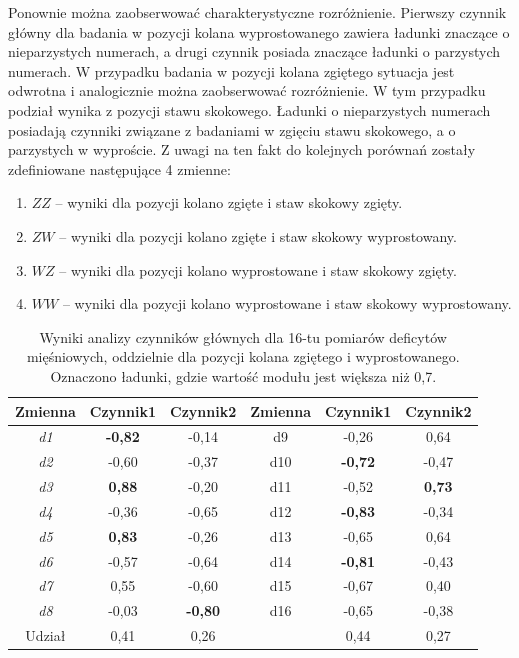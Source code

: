 Ponownie można zaobserwować charakterystyczne rozróżnienie. Pierwszy czynnik główny dla badania w pozycji kolana wyprostowanego zawiera ładunki znaczące o nieparzystych numerach, a drugi czynnik posiada znaczące ładunki o parzystych numerach. W przypadku badania w pozycji kolana zgiętego sytuacja jest odwrotna i analogicznie można zaobserwować rozróżnienie. W tym przypadku podział wynika z pozycji stawu skokowego. Ładunki o nieparzystych numerach posiadają czynniki związane z badaniami w zgięciu stawu skokowego, a o parzystych w wyproście. \linebreak Z uwagi na ten fakt do kolejnych porównań zostały zdefiniowane następujące 4 zmienne:
\begin{enumerate}
	\item $ZZ$ -- wyniki dla pozycji kolano zgięte i staw skokowy zgięty.
	\item $ZW$ -- wyniki dla pozycji kolano zgięte i staw skokowy wyprostowany.
	\item $WZ$ -- wyniki dla pozycji kolano wyprostowane i staw skokowy zgięty.
	\item $WW$ -- wyniki dla pozycji kolano wyprostowane i staw skokowy wyprostowany.
\end{enumerate} 
\begin{table}[h!]
	\centering
	\setlength{\tabcolsep}{3pt}
	\setlength\extrarowheight{2pt}
	\caption{Wyniki analizy czynników głównych dla 16-tu pomiarów deficytów mięśniowych, oddzielnie dla pozycji kolana zgiętego i wyprostowanego. Oznaczono ładunki, gdzie wartość modułu jest większa niż 0,7.}
	\label{tab:pca-muscles-knee-strait-bended}
	\begin{tabular}{c|c|c||c|c|c}
		
		Zmienna&Czynnik1&Czynnik2&Zmienna&Czynnik1&Czynnik2 \\
		\hline \hline
		\textit{d1}&\textbf{-0,82}&-0,14&d9&-0,26&0,64 \\
		\hline
		\textit{d2}&-0,60&-0,37&d10&\textbf{-0,72}&-0,47 \\
		\hline
		\textit{d3}&\textbf{0,88}&-0,20&d11&-0,52&\textbf{0,73} \\
		\hline
		\textit{d4}&-0,36&-0,65&d12&\textbf{-0,83}&-0,34 \\
		\hline
		\textit{d5}&\textbf{0,83}&-0,26&d13&-0,65&0,64 \\
		\hline
		\textit{d6}&-0,57&-0,64&d14&\textbf{-0,81}&-0,43 \\
		\hline
		\textit{d7}&0,55&-0,60&d15&-0,67&0,40 \\
		\hline
		\textit{d8}&-0,03&\textbf{-0,80}&d16&-0,65&-0,38 \\
		\hline\hline
		Udział&0,41&0,26&&0,44&0,27 \\
		
	\end{tabular}
\end{table}


